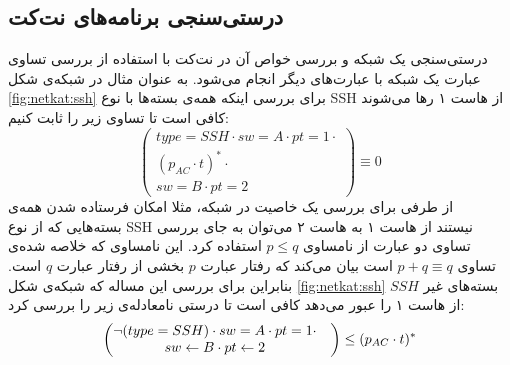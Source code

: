\subsection{درستی‌سنجی برنامه‌های نت‌کت}
درستی‌سنجی یک شبکه و بررسی خواص آن در نت‌کت با استفاده از بررسی تساوی عبارت یک شبکه با عبارت‌های دیگر انجام می‌شود.
به عنوان مثال در شبکه‌ی شکل
\ref{fig:netkat:ssh}
برای بررسی اینکه همه‌ی بسته‌ها با نوع
SSH
از هاست ۱ رها می‌شوند کافی است تا تساوی زیر را ثابت کنیم:
\begin{equation*}
    \begin{pmatrix}
        type = SSH \cdot sw = A \cdot pt = 1 \cdot \\
        (p_{AC}\cdot t) ^ * \cdot                  \\
        sw = B\cdot pt = 2
    \end{pmatrix}
    \equiv 0
\end{equation*}
از طرفی برای بررسی یک خاصیت در شبکه، مثلا امکان فرستاده شدن‌ همه‌ی بسته‌هایی که از نوع
SSH
نیستند از هاست ۱ به هاست ۲
می‌توان به جای بررسی تساوی دو عبارت از نامساوی
$p \leq q$
استفاده کرد.
این نامساوی که خلاصه شده‌ی تساوی
$p + q \equiv q$
است بیان می‌کند که رفتار عبارت
$p$
بخشی از رفتار عبارت
$q$
است.
بنابراین برای بررسی این مساله که شبکه‌ی شکل
\ref{fig:netkat:ssh}
بسته‌های غیر 
$SSH$
از هاست ۱ را عبور می‌دهد کافی است تا درستی نامعادله‌ی زیر را بررسی کرد:
\begin{equation*}
    \begin{pmatrix}
        \neg(type = SSH) \cdot sw = A \cdot pt = 1 \cdot & \\
        sw \leftarrow B \cdot pt \leftarrow 2                          &
    \end{pmatrix}
    \leq (p_{AC}\cdot t)^ *
\end{equation*}